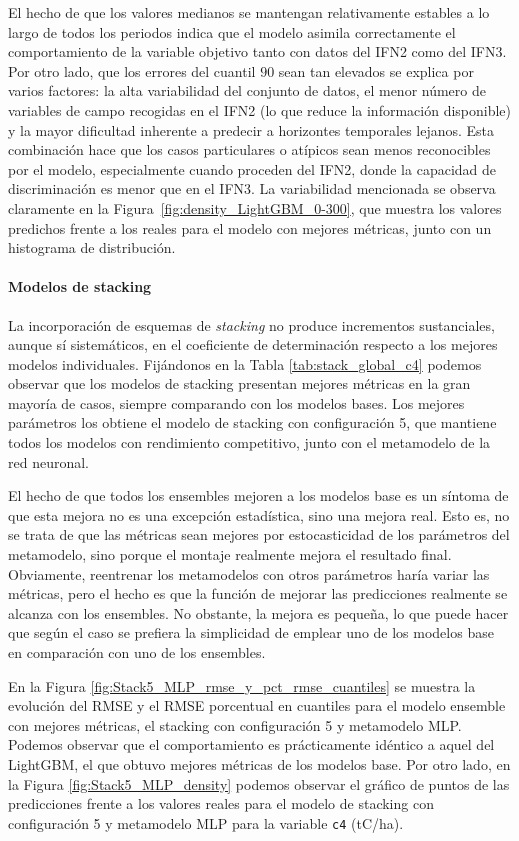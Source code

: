 El hecho de que los valores medianos se mantengan relativamente estables a lo largo de todos los periodos indica que el modelo asimila correctamente el comportamiento de la variable objetivo tanto con datos del IFN2 como del IFN3. Por otro lado, que los errores del cuantil $90$ sean tan elevados se explica por varios factores: la alta variabilidad del conjunto de datos, el menor número de variables de campo recogidas en el IFN2 (lo que reduce la información disponible) y la mayor dificultad inherente a predecir a horizontes temporales lejanos. Esta combinación hace que los casos particulares o atípicos sean menos reconocibles por el modelo, especialmente cuando proceden del IFN2, donde la capacidad de discriminación es menor que en el IFN3. La variabilidad mencionada se observa claramente en la Figura~\ref{fig:density_LightGBM_0-300}, que muestra los valores predichos frente a los reales para el modelo con mejores métricas, junto con un histograma de distribución.

\paragraph{Modelos de stacking}

La incorporación de esquemas de \textit{stacking} no produce incrementos sustanciales, aunque sí sistemáticos, en el coeficiente de determinación respecto a los mejores modelos individuales. Fijándonos en la Tabla \ref{tab:stack_global_c4} podemos observar que los modelos de stacking presentan mejores métricas en la gran mayoría de casos, siempre comparando con los modelos bases. Los mejores parámetros los obtiene el modelo de stacking con configuración 5, que mantiene todos los modelos con rendimiento competitivo, junto con el metamodelo de la red neuronal.

El hecho de que todos los ensembles mejoren a los modelos base es un síntoma de que esta mejora no es una excepción estadística, sino una mejora real. Esto es, no se trata de que las métricas sean mejores por estocasticidad de los parámetros del metamodelo, sino porque el montaje realmente mejora el resultado final. Obviamente, reentrenar los metamodelos con otros parámetros haría variar las métricas, pero el hecho es que la función de mejorar las predicciones realmente se alcanza con los ensembles. No obstante, la mejora es pequeña, lo que puede hacer que según el caso se prefiera la simplicidad de emplear uno de los modelos base en comparación con uno de los ensembles. 

En la Figura \ref{fig:Stack5_MLP_rmse_y_pct_rmse_cuantiles} se muestra la evolución del RMSE y el RMSE porcentual en cuantiles para el modelo ensemble con mejores métricas, el stacking con configuración 5 y metamodelo MLP. Podemos observar que el comportamiento es prácticamente idéntico a aquel del LightGBM, el que obtuvo mejores métricas de los modelos base. 
Por otro lado, en la Figura \ref{fig:Stack5_MLP_density} podemos observar el gráfico de puntos de las predicciones frente a los valores reales para el modelo de stacking con configuración 5 y metamodelo MLP para la variable \texttt{c4} (tC/ha).


